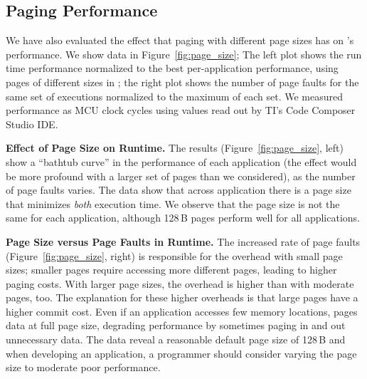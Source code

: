 \subsection{\sys Paging Performance}
\label{sec:results_memory_management}

We have also evaluated the effect that paging with different page sizes has on \sys's performance. We show data in Figure~\ref{fig:page_size}; The left plot shows the run time performance normalized to the best per-application performance, using pages of different sizes in \sys; the right plot shows the number of page faults for the same set of executions normalized to the maximum of each set. We measured performance as MCU clock cycles using values read out by TI's Code Composer Studio IDE. 

\textbf{Effect of Page Size on \sys Runtime.} The results (Figure~\ref{fig:page_size}, left) show a ``bathtub curve'' in the performance of each application (the effect would be more profound with a larger set of pages than we considered), as the number of page faults varies. The data show that across application there is a page size that minimizes \emph{both} execution time. We observe that the page size is not the same for each application, although 128\,B pages perform well for all applications. 

\textbf{Page Size versus Page Faults in \sys Runtime.} The increased rate of page faults (Figure~\ref{fig:page_size}, right) is responsible for the overhead with small page sizes; smaller pages require accessing more different pages, leading to higher paging costs. With larger page sizes, the overhead is higher than with moderate pages, too. The explanation for these higher overheads is that large pages have a higher commit cost. Even if an application accesses few memory locations, \sys pages data at full page size, degrading performance by sometimes paging in and out unnecessary data. The data reveal a reasonable default page size of 128\,B and when developing an application, a programmer should consider varying the page size to moderate poor performance.

